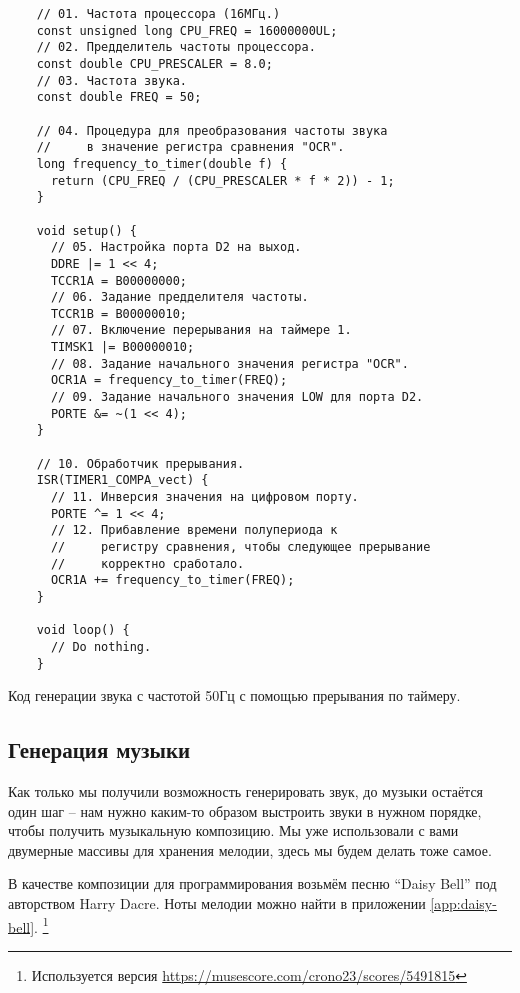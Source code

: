 \documentclass[../sparc.tex]{subfiles}
\begin{document}
\newpage
\begin{listing}[H]
  \begin{verbatim}
    // 01. Частота процессора (16МГц.)
    const unsigned long CPU_FREQ = 16000000UL;
    // 02. Предделитель частоты процессора.
    const double CPU_PRESCALER = 8.0;
    // 03. Частота звука.
    const double FREQ = 50;

    // 04. Процедура для преобразования частоты звука
    //     в значение регистра сравнения "OCR".
    long frequency_to_timer(double f) {
      return (CPU_FREQ / (CPU_PRESCALER * f * 2)) - 1;
    }

    void setup() {
      // 05. Настройка порта D2 на выход.
      DDRE |= 1 << 4;
      TCCR1A = B00000000;
      // 06. Задание предделителя частоты.
      TCCR1B = B00000010;
      // 07. Включение перерывания на таймере 1.
      TIMSK1 |= B00000010;
      // 08. Задание начального значения регистра "OCR".
      OCR1A = frequency_to_timer(FREQ);
      // 09. Задание начального значения LOW для порта D2.
      PORTE &= ~(1 << 4);
    }

    // 10. Обработчик прерывания.
    ISR(TIMER1_COMPA_vect) {
      // 11. Инверсия значения на цифровом порту.
      PORTE ^= 1 << 4;
      // 12. Прибавление времени полупериода к
      //     регистру сравнения, чтобы следующее прерывание
      //     корректно сработало.
      OCR1A += frequency_to_timer(FREQ);
    }

    void loop() {
      // Do nothing.
    }
  \end{verbatim}
  \caption{Код генерации звука с частотой 50Гц с помощью прерывания по таймеру.}
  \label{listing:mcu-music-2}
\end{listing}

\newpage
\subsection{Генерация музыки}
\label{subsection:mcu-music-1}

Как только мы получили возможность генерировать звук, до музыки остаётся один
шаг -- нам нужно каким-то образом выстроить звуки в нужном порядке, чтобы
получить музыкальную композицию.  Мы уже использовали с вами двумерные массивы
для хранения мелодии, здесь мы будем делать тоже самое.

В качестве композиции для программирования возьмём песню ``Daisy Bell'' под
авторством Harry Dacre.  Ноты мелодии можно найти в приложении
\ref{app:daisy-bell}.  \footnote{Используется версия
\url{https://musescore.com/crono23/scores/5491815}}
\end{document}
